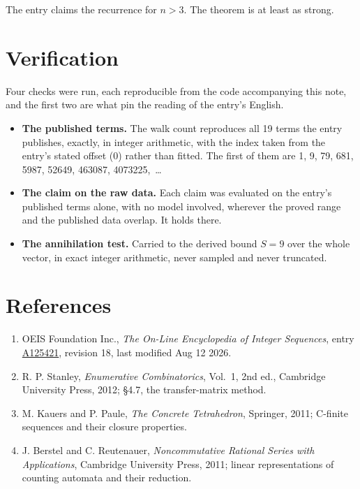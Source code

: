 \documentclass[11pt]{article}
\theoremstyle{definition}
\begin{document}
The entry claims the recurrence for $n > 3$. The theorem is at least as strong.

\section{Verification}

Four checks were run, each reproducible from the code accompanying this note, and the first two are what pin the reading of the entry's English.

\begin{itemize}

\item {\bfseries The published terms.} The walk count reproduces all 19 terms the entry publishes, exactly, in integer arithmetic, with the index taken from the entry's stated offset (0) rather than fitted. The first of them are 1, 9, 79, 681, 5987, 52649, 463087, 4073225,~\dots

\item {\bfseries The claim on the raw data.} Each claim was evaluated on the entry's published terms alone, with no model involved, wherever the proved range and the published data overlap. It holds there.

\item {\bfseries The annihilation test.} Carried to the derived bound $S = 9$ over the whole vector, in exact integer arithmetic, never sampled and never truncated.

\end{itemize}

\section{References}

\begin{enumerate}

\item OEIS Foundation Inc., \emph{The On-Line Encyclopedia of Integer Sequences}, entry \href{https://oeis.org/A125421}{A125421}, revision 18, last modified Aug 12 2026.

\item R. P. Stanley, \emph{Enumerative Combinatorics}, Vol.~1, 2nd ed., Cambridge University Press, 2012; \S4.7, the transfer-matrix method.

\item M. Kauers and P. Paule, \emph{The Concrete Tetrahedron}, Springer, 2011; C-finite sequences and their closure properties.

\item J. Berstel and C. Reutenauer, \emph{Noncommutative Rational Series with Applications}, Cambridge University Press, 2011; linear representations of counting automata and their reduction.

\end{enumerate}
\end{document}
